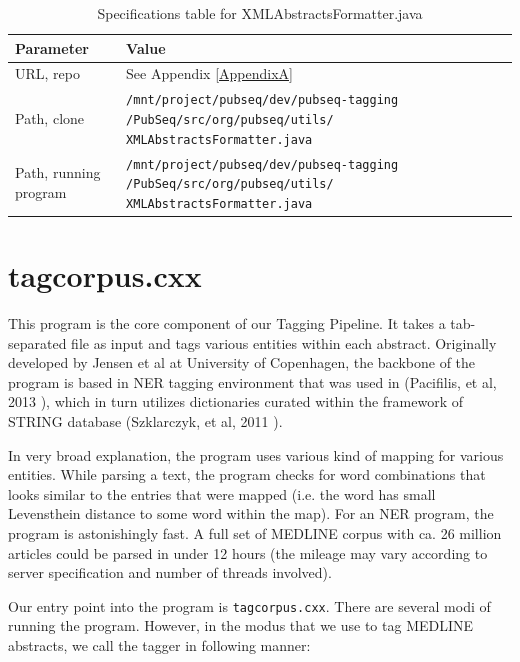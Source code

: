\begin{table}[htbp]
\caption{Specifications table for XMLAbstractsFormatter.java}
\centering
\begin{tabularx}{\textwidth}{ | l | X | }
  \hline
  Parameter & Value \\
  \hline
  URL, repo & See Appendix \ref{AppendixA} \\
  Path, clone & \texttt{/mnt/project/pubseq/dev/pubseq-tagging /PubSeq/src/org/pubseq/utils/ XMLAbstractsFormatter.java} \\
  Path, running program & \texttt{/mnt/project/pubseq/dev/pubseq-tagging /PubSeq/src/org/pubseq/utils/ XMLAbstractsFormatter.java} \\
  \hline
\end{tabularx}
\end{table}


\section{tagcorpus.cxx}

This program is the core component of our Tagging Pipeline. It takes a tab-separated file as input and tags various entities within each abstract. Originally developed by Jensen et al at University of Copenhagen, the backbone of the program is based in NER tagging environment that was used in (Pacifilis, et al, 2013 \citep{pafilis2013species}), which in turn utilizes dictionaries curated within the framework of STRING database (Szklarczyk, et al, 2011 \citep{szklarczyk2011string}).

In very broad explanation, the program uses various kind of mapping for various entities. While parsing a text, the program checks for word combinations that looks similar to the entries that were mapped (i.e. the word has small Levensthein distance \citep{levenshtein1966binary} to some word within the map). For an NER program, the program is astonishingly fast. A full set of MEDLINE corpus with ca. 26 million articles could be parsed in under 12 hours (the mileage may vary according to server specification and number of threads involved).

Our entry point into the program is \texttt{tagcorpus.cxx}. There are several modi of running the program. However, in the modus that we use to tag MEDLINE abstracts, we call the tagger in following manner:


